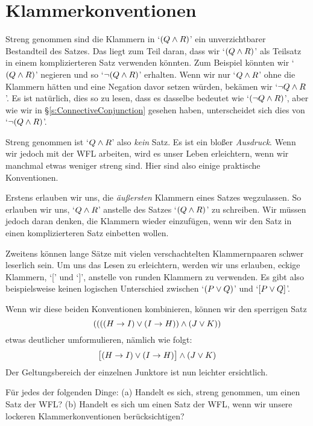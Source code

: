 
\section{Klammerkonventionen}
\label{TFLconventions}
Streng genommen sind die Klammern in `$(Q \wedge R)$' ein unverzichtbarer Bestandteil des Satzes. Das liegt zum Teil daran, dass wir `$(Q \wedge R)$' als Teilsatz in einem komplizierteren Satz verwenden könnten. Zum Beispiel könnten wir `$(Q \wedge R)$' negieren und so `$\neg(Q \wedge R)$' erhalten. Wenn wir nur `$Q \wedge R$' ohne die Klammern hätten und eine Negation davor setzen würden, bekämen wir `$\neg Q \wedge R$'. Es ist natürlich, dies so zu lesen, dass es dasselbe bedeutet wie `$(\neg Q \wedge R)$', aber wie wir in \S\ref{s:ConnectiveConjunction} gesehen haben, unterscheidet sich dies von `$\neg(Q\wedge R)$'.

Streng genommen ist `$Q \wedge R$' also \emph{kein} Satz. Es ist ein blo{\ss}er \emph{Ausdruck}. Wenn wir jedoch mit der WFL arbeiten, wird es unser Leben erleichtern, wenn wir manchmal etwas weniger streng sind. Hier sind also einige praktische Konventionen.

Erstens erlauben wir uns, die \emph{äu{\ss}ersten} Klammern eines Satzes wegzulassen. So erlauben wir uns, `$Q \wedge R$' anstelle des Satzes `$(Q \wedge R)$' zu schreiben. Wir müssen jedoch daran denken, die Klammern wieder einzufügen, wenn wir den Satz in einen komplizierteren Satz einbetten wollen.

Zweitens können lange Sätze mit vielen verschachtelten Klammernpaaren schwer leserlich sein. Um uns das Lesen zu erleichtern, werden wir uns erlauben, eckige Klammern, `[' und `]', anstelle von runden Klammern zu verwenden. Es gibt also beispielsweise keinen logischen Unterschied zwischen `$(P\vee Q)$' und `$[P\vee Q]$'. 

Wenn wir diese beiden Konventionen kombinieren, können wir den sperrigen Satz
$$((((H \rightarrow I) \vee (I \rightarrow H)) \wedge (J \vee K))$$
etwas deutlicher umformulieren, nämlich wie folgt:
$$\bigl[(H \rightarrow I) \vee (I \rightarrow H)\bigr] \wedge (J \vee K)$$
Der Geltungsbereich der einzelnen Junktore ist nun leichter ersichtlich.

\practiceproblems

\solutions
\problempart
\label{pr.wiffTFL}
Für jedes der folgenden Dinge: (a) Handelt es sich, streng genommen, um einen Satz der WFL? (b) Handelt es sich um einen Satz der WFL, wenn wir unsere lockeren Klammerkonventionen berücksichtigen?

